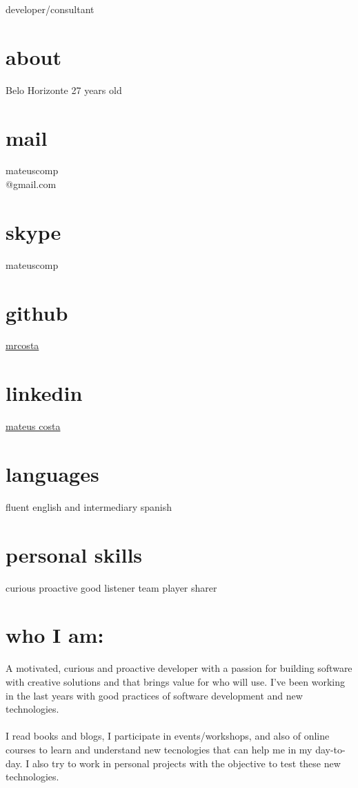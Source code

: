 \documentclass[]{friggeri-cv}
\begin{document}
       {developer/consultant}

\begin{aside}
  \section{about}
    Belo Horizonte
    27 years old
  \section{mail}
    mateuscomp\\@gmail.com 
  \section{skype}
    mateuscomp
  \section{github}
    \href{https://github.com/mrcosta}{mrcosta}
  \section{linkedin}
    \href{www.linkedin.com/in/mateusrodriguescosta}{mateus costa}
  \section{languages}
    fluent english and intermediary spanish
  \section{personal skills}
  curious
  proactive
  good listener
  team player
  sharer
\end{aside}

\section{who I am:}

A motivated, curious and proactive developer with a passion for building software with creative solutions and that brings value for who will use. I've been working in the last years with good practices of software development and new technologies.
    \\\\ I read books and blogs, I participate in events/workshops, and also of online courses to learn and understand new tecnologies that can help me in my day-to-day. I also try to work in personal projects with the objective to test these new technologies.
\end{document}
